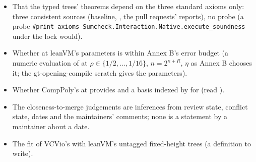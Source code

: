 \begin{itemize}
\item That the typed trees' theorems depend on the three standard axioms only: three consistent
  sources (baseline, , the pull requests' reports), no probe (a probe
  \texttt{\#print axioms Sumcheck.Interaction.Native.execute\_soundness} under the lock would).
\item Whether  at leanVM's parameters is within Annex B's error
  budget (a numeric evaluation of  at
  $\rho \in \{1/2, \ldots, 1/16\}$, $n = 2^{\kappa+R}$, $\eta$ as Annex B chooses it; the
  gt-opening-compile scratch  gives the parameters).
\item Whether CompPoly's  at  provides  and a
  basis indexed by  for  (read
  ).
\item The closeness-to-merge judgements are inferences from review state, conflict state, dates
  and the maintainers' comments; none is a statement by a maintainer about a date.
\item The fit of VCVio's  with leanVM's untagged fixed-height trees (a
  definition to write).
\end{itemize}

\par
\arkRestorePar
\let\lean\arkSavedLean \let\code\arkSavedCode \let\file\arkSavedFile
